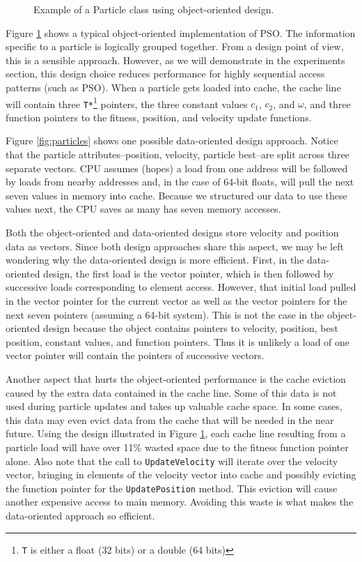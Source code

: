 \begin{figure}
  
  \caption{Example of a Particle class using object-oriented
    design.}\label{fig:particle}
\end{figure}

Figure \ref{fig:particle} shows a typical object-oriented implementation of PSO.
The information specific to a particle is logically grouped together. From a
design point of view, this is a sensible approach. However, as we will
demonstrate in the experiments section, this design choice reduces performance
for highly sequential access patterns (such as PSO).
When a particle gets loaded into cache, the
cache line will contain three \texttt{T*}\footnote{\texttt{T} is either a float
  (32 bits) or a double (64 bits)} pointers, the three constant values
$c_1$, $c_2$, and $\omega$, and three function pointers to the fitness,
position, and velocity update functions.

Figure \ref{fig:particles} shows one possible data-oriented design
approach. Notice that the particle attributes--position, velocity, particle
best--are split across three separate vectors. CPU
assumes (hopes) a load from one address will be followed by loads from nearby
addresses and, in the case of 64-bit floats, will pull the next seven values in
memory into cache. Because we structured our data to use these values next, the
CPU saves as many has seven memory accesses.

Both the object-oriented and data-oriented designs store velocity and position
data as vectors. Since both design approaches share this aspect, we may be left
wondering why the data-oriented design is more efficient. First, in the
data-oriented design, the first load is the vector pointer, which is then
followed by successive loads corresponding to element access. However, that
initial load pulled in the vector pointer for the current vector as well as the
vector pointers for the next seven pointers (assuming a 64-bit system). This is
not the case in the object-oriented design because the object contains pointers
to velocity, position, best position, constant values, and function
pointers. Thus it is unlikely a load of one vector pointer will contain the
pointers of successive vectors.

Another aspect that hurts the object-oriented performance is the cache eviction
caused by the extra data contained in the cache line. Some of this data is not
used during particle updates and takes up valuable cache space. In some cases,
this data may even evict data from the cache that will be needed in the near
future. Using the design illustrated in Figure \ref{fig:particle}, each cache
line resulting from a particle load will have over 11\% wasted space due to the
fitness function pointer alone. Also note that the call to
\texttt{UpdateVelocity} will iterate over the velocity vector, bringing in
elements of the velocity vector into cache and possibly evicting the function
pointer for the \texttt{UpdatePosition} method. This eviction will cause another
expensive access to main memory. Avoiding this waste is what makes the
data-oriented approach so efficient.


